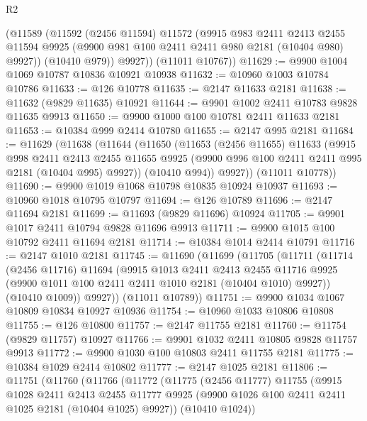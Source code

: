 \begin{lexlean}{R2}
\begin{coremodule}
        (@11589
          (@11592
            (@2456 @11594)
            @11572
            (@9915
              @983
              @2411
              @2413
              @2455
              @11594
              @9925
              (@9900 @981 @100 @2411 @2411 @980 @2181 (@10404 @980) @9927))
            (@10410 @979))
          @9927))
      (@11011 @10767))
@11629 := @9900 @1004 @1069 @10787 @10836 @10921 @10938
@11632 := @10960 @1003 @10784 @10786
@11633 := @126 @10778
@11635 := @2147 @11633 @2181
@11638 := @11632 (@9829 @11635) @10921
@11644 := @9901 @1002 @2411 @10783 @9828 @11635 @9913
@11650 := @9900 @1000 @100 @10781 @2411 @11633 @2181
@11653 := @10384 @999 @2414 @10780
@11655 := @2147 @995 @2181
@11684 := @11629
    (@11638
      (@11644
        (@11650
          (@11653
            (@2456 @11655)
            @11633
            (@9915
              @998
              @2411
              @2413
              @2455
              @11655
              @9925
              (@9900 @996 @100 @2411 @2411 @995 @2181 (@10404 @995) @9927))
            (@10410 @994))
          @9927))
      (@11011 @10778))
@11690 := @9900 @1019 @1068 @10798 @10835 @10924 @10937
@11693 := @10960 @1018 @10795 @10797
@11694 := @126 @10789
@11696 := @2147 @11694 @2181
@11699 := @11693 (@9829 @11696) @10924
@11705 := @9901 @1017 @2411 @10794 @9828 @11696 @9913
@11711 := @9900 @1015 @100 @10792 @2411 @11694 @2181
@11714 := @10384 @1014 @2414 @10791
@11716 := @2147 @1010 @2181
@11745 := @11690
    (@11699
      (@11705
        (@11711
          (@11714
            (@2456 @11716)
            @11694
            (@9915
              @1013
              @2411
              @2413
              @2455
              @11716
              @9925
              (@9900 @1011 @100 @2411 @2411 @1010 @2181 (@10404 @1010) @9927))
            (@10410 @1009))
          @9927))
      (@11011 @10789))
@11751 := @9900 @1034 @1067 @10809 @10834 @10927 @10936
@11754 := @10960 @1033 @10806 @10808
@11755 := @126 @10800
@11757 := @2147 @11755 @2181
@11760 := @11754 (@9829 @11757) @10927
@11766 := @9901 @1032 @2411 @10805 @9828 @11757 @9913
@11772 := @9900 @1030 @100 @10803 @2411 @11755 @2181
@11775 := @10384 @1029 @2414 @10802
@11777 := @2147 @1025 @2181
@11806 := @11751
    (@11760
      (@11766
        (@11772
          (@11775
            (@2456 @11777)
            @11755
            (@9915
              @1028
              @2411
              @2413
              @2455
              @11777
              @9925
              (@9900 @1026 @100 @2411 @2411 @1025 @2181 (@10404 @1025) @9927))
            (@10410 @1024))

\end{coremodule}
\end{lexlean}
